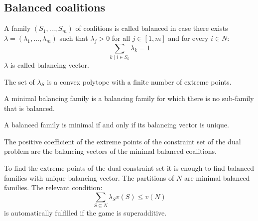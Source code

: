\subsection{Balanced coalitions}
\begin{definition}
    A family $(S_1,\dots,S_m)$ of coalitions is called balanced in case there exists $\lambda=(\lambda_1,\dots,\lambda_m)$ such that $\lambda_j>0$ for all $j\in [1,m]$ and for every $i\in N$: 
    \[\sum_{k\mid i\in S_k}\lambda_k=1\]
    $\lambda$ is called balancing vector. 
\end{definition}
\noindent The set of $\lambda_S$ is a convex polytope with a finite number of extreme points. 
\begin{definition}
    A minimal balancing family is a balancing family for which there is no sub-family that is balanced.
\end{definition}
\begin{lemma}
    A balanced family is minimal if and only if its balancing vector is unique. 
\end{lemma}
\begin{theorem}
    The positive coefficient of the extreme points of the constraint set of the dual problem are the balancing vectors of the minimal balanced coalitions.  
\end{theorem}
\noindent To find the extreme points of the dual constraint set it is enough to find balanced families with unique balancing vector. 
The partitions of $N$ are minimal balanced families.
The relevant condition: 
\[\sum_{S\subseteq N}\lambda_Sv(S)\leq v(N)\]
is automatically fulfilled if the game is superadditive. 